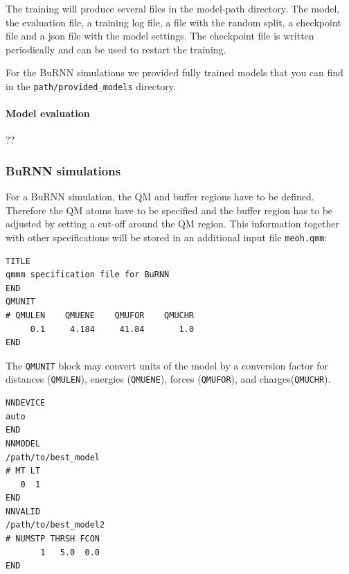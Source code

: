 The training will produce several files in the model-path directory. The model, the evaluation file, a training log file, a file with the random split, a checkpoint file and a json file with the model settings. The checkpoint file is written periodically and can be used to restart the training.   

For the BuRNN simulations we provided fully trained models that you can find in the 
\texttt{path/provided\_models} directory.

\paragraph{Model evaluation}
??


\subsubsection{BuRNN simulations}
For a BuRNN simulation, the QM and buffer regions have to be defined. Therefore the QM atoms have to be specified and the buffer region has to be adjusted by setting a cut-off around the QM region. This information together with other specifications will be stored in an additional input file \texttt{meoh.qmm}:

\begin{lstlisting}[breaklines=true, breakatwhitespace=false]
TITLE
qmmm specification file for BuRNN  
END
QMUNIT
# QMULEN    QMUENE    QMUFOR    QMUCHR
     0.1     4.184     41.84       1.0
END
\end{lstlisting}

The \texttt{QMUNIT} block may convert units of the model by a conversion factor for distances (\texttt{QMULEN}), energies (\texttt{QMUENE}), forces (\texttt{QMUFOR}), and charges(\texttt{QMUCHR}).

\begin{lstlisting}[breaklines=true, breakatwhitespace=false]
NNDEVICE
auto
END
NNMODEL
/path/to/best_model
# MT LT
   0  1
END
NNVALID
/path/to/best_model2
# NUMSTP THRSH FCON 
       1   5.0  0.0
END
\end{lstlisting}


